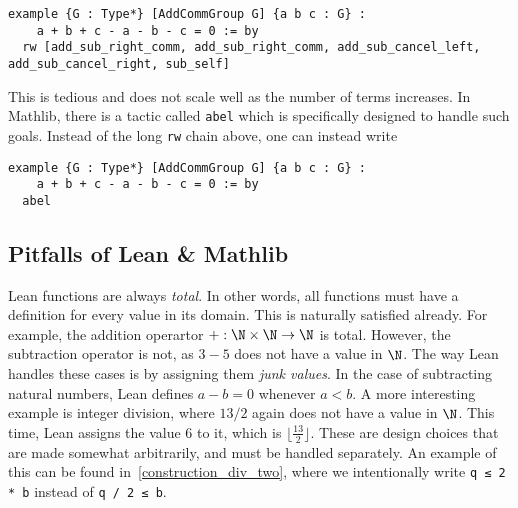 \begin{verbatim}
example {G : Type*} [AddCommGroup G] {a b c : G} :
    a + b + c - a - b - c = 0 := by
  rw [add_sub_right_comm, add_sub_right_comm, add_sub_cancel_left, add_sub_cancel_right, sub_self]
\end{verbatim}

This is tedious and does not scale well as the number of terms increases. In Mathlib, there is a tactic called \texttt{abel} which is specifically designed to handle such goals. Instead of the long \texttt{rw} chain above, one can instead write

\begin{verbatim}
example {G : Type*} [AddCommGroup G] {a b c : G} :
    a + b + c - a - b - c = 0 := by
  abel
\end{verbatim}

\subsection{Pitfalls of Lean \& Mathlib} \label{sec:lean_pitfall}

Lean functions are always \textit{total}. In other words, all functions must have a definition for every value in its domain. This is naturally satisfied already. For example, the addition operartor \(+ : \N \times \N \to \N\) is total. However, the subtraction operator is not, as \(3 - 5\) does not have a value in \(\N\). The way Lean handles these cases is by assigning them \textit{junk values}. In the case of subtracting natural numbers, Lean defines \(a - b = 0\) whenever \(a < b\). A more interesting example is integer division, where \(13 / 2\) again does not have a value in \(\N\). This time, Lean assigns the value \(6\) to it, which is \(\lfloor\frac{13}{2}\rfloor\). These are design choices that are made somewhat arbitrarily, and must be handled separately. An example of this can be found in~\cref{construction_div_two}, where we intentionally write \texttt{q ≤ 2 * b} instead of \texttt{q / 2 ≤ b}.
